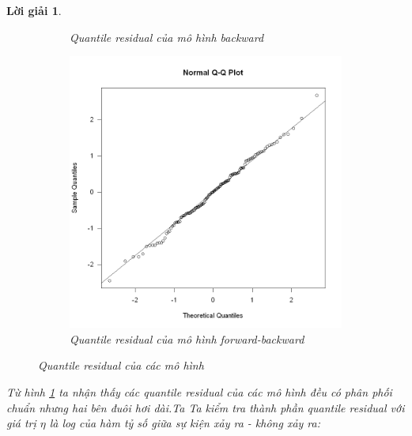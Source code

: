 \documentclass[14pt, a4paper]{article}
\theoremstyle{sltheorem}
\theoremstyle{soltheorem}
\newtheorem*{loigiai}{Lời giải}
\begin{document}
\begin{loigiai}
\begin{figure}[h!]
\begin{subfigure}[b]{0.4\textwidth}
            \caption{Quantile residual của mô hình backward}
        \end{subfigure}
        \hfill
        \begin{subfigure}[b]{0.4\textwidth}
            \centering
            \includegraphics[width=\textwidth]{figures/mbo_quantile_resid.png}
            \caption{Quantile residual của mô hình forward-backward}
        \end{subfigure}
        \caption{Quantile residual của các mô hình}
        \label{fig:Quantile-residual}
    \end{figure}
    Từ hình \ref{fig:Quantile-residual} ta nhận thấy các quantile residual của các mô hình đều có phân phối chuẩn nhưng hai bên đuôi hơi dài.Ta
    Ta kiểm tra thành phần quantile residual với giá trị $\eta$ là log của hàm tỷ số giữa sự kiện xảy ra - không xảy ra:


\end{loigiai}
\end{document}
